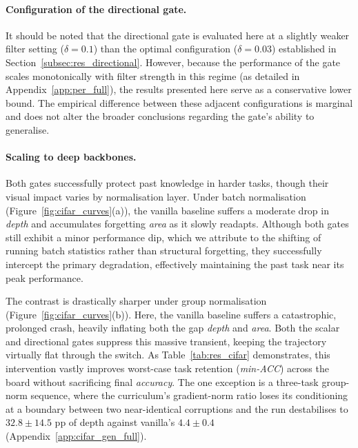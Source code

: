 \paragraph{Configuration of the directional gate.}
It should be noted that the directional gate is evaluated here at a slightly weaker filter setting ($\delta{=}0.1$) than the optimal configuration ($\delta{=}0.03$) established in Section~\ref{subsec:res_directional}. However, because the performance of the gate scales monotonically with filter strength in this regime (as detailed in Appendix~\ref{app:per_full}), the results presented here serve as a conservative lower bound. The empirical difference between these adjacent configurations is marginal and does not alter the broader conclusions regarding the gate's ability to generalise.

\paragraph{Scaling to deep backbones.}
Both gates successfully protect past knowledge in harder tasks, though their visual impact varies by normalisation layer. Under batch normalisation (Figure~\ref{fig:cifar_curves}(a)), the vanilla baseline suffers a moderate drop in \emph{depth} and accumulates forgetting \emph{area} as it slowly readapts. Although both gates still exhibit a minor performance dip, which we attribute to the shifting of running batch statistics rather than structural forgetting, they successfully intercept the primary degradation, effectively maintaining the past task near its peak performance.

The contrast is drastically sharper under group normalisation (Figure~\ref{fig:cifar_curves}(b)). Here, the vanilla baseline suffers a catastrophic, prolonged crash, heavily inflating both the gap \emph{depth} and \emph{area}. Both the scalar and directional gates suppress this massive transient, keeping the trajectory virtually flat through the switch. As Table~\ref{tab:res_cifar} demonstrates, this intervention vastly improves worst-case task retention (\emph{min-ACC}) across the board without sacrificing final \emph{accuracy}. The one exception is a three-task group-norm sequence, where the curriculum's gradient-norm ratio loses its conditioning at a boundary between two near-identical corruptions and the run destabilises to $32.8 \pm 14.5$ pp of depth against vanilla's $4.4 \pm 0.4$ (Appendix~\ref{app:cifar_gen_full}).

